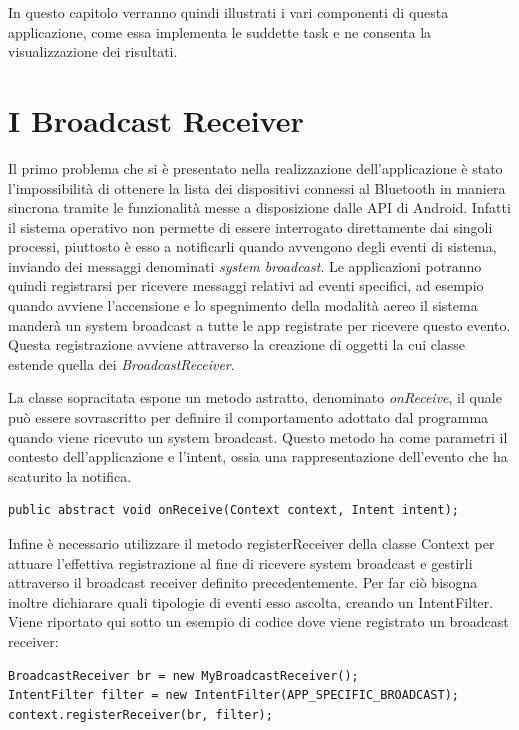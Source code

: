 In questo capitolo verranno quindi illustrati i vari componenti di questa applicazione, come essa implementa le suddette task e ne consenta la visualizzazione dei risultati. 

\section{I Broadcast Receiver}
Il primo problema che si è presentato nella realizzazione dell'applicazione è stato l'impossibilità di ottenere la lista dei dispositivi connessi al Bluetooth in maniera sincrona tramite le funzionalità messe a disposizione dalle API di Android. Infatti il sistema operativo non permette di essere interrogato direttamente dai singoli processi, piuttosto è esso a notificarli quando avvengono degli eventi di sistema, inviando dei messaggi denominati \textit{system broadcast}. Le applicazioni potranno quindi registrarsi per ricevere messaggi relativi ad eventi specifici, ad esempio quando avviene l'accensione e lo spegnimento della modalità aereo il sistema manderà un system broadcast a tutte le app registrate per ricevere questo evento. Questa registrazione avviene attraverso la creazione di oggetti la cui classe estende quella dei \textit{BroadcastReceiver}.\cite{ref:android-broadcast}

La classe sopracitata espone un metodo astratto, denominato \textit{onReceive}, il quale può essere sovrascritto per definire il comportamento adottato dal programma quando viene ricevuto un system broadcast. Questo metodo ha come parametri il contesto dell'applicazione e l'intent, ossia una rappresentazione dell'evento che ha scaturito la notifica.

\begin{verbatim}
public abstract void onReceive(Context context, Intent intent);
\end{verbatim}

Infine è necessario utilizzare il metodo registerReceiver della classe Context per attuare l'effettiva registrazione al fine di ricevere system broadcast e gestirli attraverso il broadcast receiver definito precedentemente. Per far ciò bisogna inoltre dichiarare quali tipologie di eventi esso ascolta, creando un IntentFilter. Viene riportato qui sotto un esempio di codice dove viene registrato un broadcast receiver:
\begin{verbatim}
BroadcastReceiver br = new MyBroadcastReceiver();
IntentFilter filter = new IntentFilter(APP_SPECIFIC_BROADCAST);
context.registerReceiver(br, filter);
\end{verbatim}

